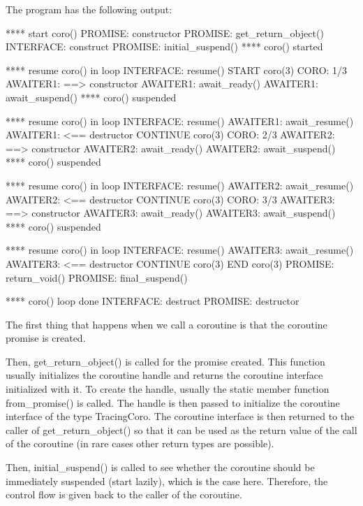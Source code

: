 The program has the following output:

\begin{shell}
**** start coro()
      PROMISE: constructor
      PROMISE: get_return_object()
        INTERFACE: construct
      PROMISE: initial_suspend()
**** coro() started

**** resume coro() in loop
        INTERFACE: resume()
  START coro(3)
  CORO: 1/3
          AWAITER1: ==> constructor
          AWAITER1: await_ready()
          AWAITER1: await_suspend()
**** coro() suspended

**** resume coro() in loop
        INTERFACE: resume()
          AWAITER1: await_resume()
          AWAITER1: <== destructor
  CONTINUE coro(3)
  CORO: 2/3
          AWAITER2: ==> constructor
          AWAITER2: await_ready()
          AWAITER2: await_suspend()
**** coro() suspended

**** resume coro() in loop
        INTERFACE: resume()
          AWAITER2: await_resume()
          AWAITER2: <== destructor
  CONTINUE coro(3)
  CORO: 3/3
          AWAITER3: ==> constructor
          AWAITER3: await_ready()
          AWAITER3: await_suspend()
**** coro() suspended

**** resume coro() in loop
        INTERFACE: resume()
          AWAITER3: await_resume()
          AWAITER3: <== destructor
  CONTINUE coro(3)
  END coro(3)
      PROMISE: return_void()
      PROMISE: final_suspend()
      
**** coro() loop done
        INTERFACE: destruct
      PROMISE: destructor
\end{shell}

The first thing that happens when we call a coroutine is that the coroutine promise is created.

Then, get\_return\_object() is called for the promise created. This function usually initializes the coroutine handle and returns the coroutine interface initialized with it. To create the handle, usually the static member function from\_promise() is called. The handle is then passed to initialize the coroutine interface of the type TracingCoro. The coroutine interface is then returned to the caller of get\_return\_object() so that it can be used as the return value of the call of the coroutine (in rare cases other return types are possible).

Then, initial\_suspend() is called to see whether the coroutine should be immediately suspended (start lazily), which is the case here. Therefore, the control flow is given back to the caller of the coroutine.

